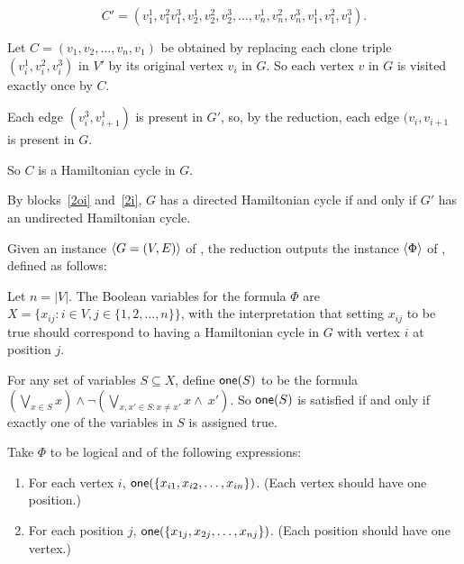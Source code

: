 \documentclass[11pt]{article}
\begin{document}
\begin{problems}
\begin{longFormProof}
\begin{block}[2i]
      \[C'=(v^1_1, v^2_1 v^3_1, v^1_2, v^2_2, v^3_2, \ldots, v^1_n,  v^2_n,  v^3_n,  v^1_1,  v^2_1,  v^3_1).\]

      \step Let $C=(v_1, v_2, \ldots, v_n, v_1)$ be obtained by replacing each clone triple $(v_i^1, v_i^2, v_i^3)$ in $V'$
      by its original vertex $v_i$ in $G$.
      So each vertex $v$ in $G$ is visited exactly once by $C$.

      \step Each edge $(v^3_i, v_{i+1}^1)$ is present in $G'$, so, by the reduction,
      each edge $(v_i, v_{i+1}$ is present in $G$.

      \step So $C$ is a Hamiltonian cycle in $G$.

      \smallskip 
    \end{block} 
    \step By blocks~\ref{2oi} and~\ref{2i},
    $G$ has a directed Hamiltonian cycle
    if and only if $G'$ has an undirected Hamiltonian cycle.
  \end{longFormProof}


  \newpage
  \problem %

  Given an instance $\langle G=(V,E) \rangle$ of ,
  the reduction outputs the instance $\langle \Phi \rangle$ of , defined as follows:
  
  \lineacross 

  Let $n=|V|$.
  The Boolean variables for the formula $\Phi$ are $X=\{x_{ij} : i\in V, j\in\{1,2,\ldots,n\}\}$,
  with the interpretation that setting $x_{ij}$ to be true should correspond to having
  a Hamiltonian cycle in $G$ with vertex $i$ at position $j$.

  \newcommand{\one}{\mbox{\sf one}}
  For any set of variables $S\subseteq X$, define $\one(S)$
  to be the formula $(\bigvee_{x \in S} x) \wedge \neg (\bigvee_{x,x'\in S: x\ne x'} x \wedge \ x')$.
  So $\one(S)$ is satisfied
  if and only if exactly one of the variables in $S$ is assigned true.

  Take $\Phi$ to be logical and of the following expressions:
  \begin{enumerate}
  \item For each vertex $i$, $\one(\{x_{i1}, x_{i2}, \ldots, x_{in}\})$.
    (Each vertex should have one position.)

  \item For each position $j$, $\one(\{x_{1j}, x_{2j}, \ldots, x_{nj}\})$.
    (Each position should have one vertex.)


\end{enumerate}
\end{problems}
\end{document}
